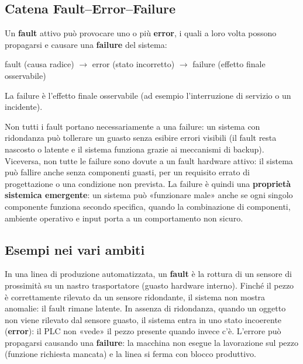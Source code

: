 \subsection{Catena Fault--Error--Failure}
Un \textbf{fault} attivo può provocare uno o più \textbf{error}, i quali a loro volta possono propagarsi e causare una \textbf{failure} del sistema:
\begin{center}
fault (causa radice) $\longrightarrow$ error (stato incorretto) $\longrightarrow$ failure (effetto finale osservabile)
\end{center}
La failure è l'effetto finale osservabile (ad esempio l'interruzione di servizio o un incidente).

\begin{intuition}
Non tutti i fault portano necessariamente a una failure: un sistema con ridondanza può tollerare un guasto senza esibire errori visibili (il fault resta nascosto o latente e il sistema funziona grazie ai meccanismi di backup). Viceversa, non tutte le failure sono dovute a un fault hardware attivo: il sistema può fallire anche senza componenti guasti, per un requisito errato di progettazione o una condizione non prevista. La failure è quindi una \textbf{proprietà sistemica emergente}: un sistema può «funzionare male» anche se ogni singolo componente funziona secondo specifica, quando la combinazione di componenti, ambiente operativo e input porta a un comportamento non sicuro.
\end{intuition}

\subsection{Esempi nei vari ambiti}
\begin{ex}
In una linea di produzione automatizzata, un \textbf{fault} è la rottura di un sensore di prossimità su un nastro trasportatore (guasto hardware interno). Finché il pezzo è correttamente rilevato da un sensore ridondante, il sistema non mostra anomalie: il fault rimane latente. In assenza di ridondanza, quando un oggetto non viene rilevato dal sensore guasto, il sistema entra in uno stato incoerente (\textbf{error}): il PLC non «vede» il pezzo presente quando invece c'è. L'errore può propagarsi causando una \textbf{failure}: la macchina non esegue la lavorazione sul pezzo (funzione richiesta mancata) e la linea si ferma con blocco produttivo.
\end{ex}

